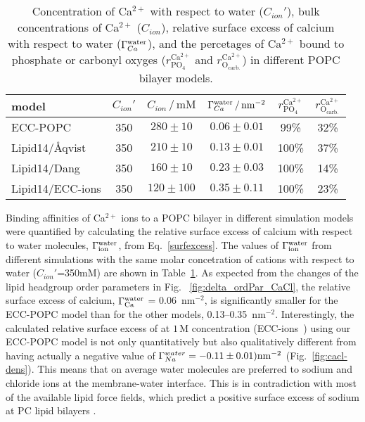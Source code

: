 \documentclass[journal=jpcbfk,manuscript=article]{achemso}
\begin{document}
\begin{table}[tb!]
  \caption{Concentration of Ca$^{2+}$ with respect to water ($C_{ion}'$), bulk concentrations of Ca$^{2+}$ ($C_{ion}$), relative surface excess of calcium with respect to water ($\Gamma_{Ca}^{\rm water}$),
    and the percetages of Ca$^{2+}$ bound to phosphate or carbonyl oxyges ($r^\mathrm{Ca^{2+}} _\mathrm{PO_4} $ and $r^\mathrm{Ca^{2+}} _\mathrm{O_{carb.}}$)
    in different POPC bilayer models. 
  \label{tab:binding}}
  \begin{tabular}{l|c c | c | c c}
    model                  & $C_{ion}'$ & $C_{ion}\,/\,\mathrm{mM}$ & $\Gamma_{Ca}^{\rm water} \,/\, \mathrm{nm}^{-2}$  & $r^\mathrm{Ca^{2+}} _\mathrm{PO_4} $ & $r^\mathrm{Ca^{2+}} _\mathrm{O_{carb.}} $ \\
    \hline
    ECC-POPC             &  350  &  $280\pm 10 $  &  $0.06 \pm 0.01 $                           &  99\%  &    32\%    \\
    Lipid14/\AA{}qvist     &  350  &  $210\pm 10 $  &  $0.13 \pm 0.01 $                          & 100\%  &    37\%     \\
    Lipid14/Dang           &  350  &  $160\pm 10 $  &  $0.23 \pm 0.03 $                            & 100\%  &    14\%    \\
    Lipid14/ECC-ions       &  350  &  $120\pm 100$  &  $0.35 \pm 0.11 $                         & 100\%  &    23\%    \\
  \end{tabular}
\end{table}

Binding affinities of Ca$^{2+}$ ions to a POPC bilayer in different simulation models were quantified by calculating the relative surface excess of calcium with respect to water molecules, $\Gamma_{\rm ion}^{\rm water}$, from Eq.~\ref{surfexcess}.
The values of $\Gamma_{\rm ion}^{\rm water}$
from different simulations with the same molar concetration of cations with respect
to water ($C_{ion}'$=350mM) are shown in Table~\ref{tab:binding}.
As expected from the changes of the lipid headgroup order parameters in Fig.~ \ref{fig:delta_ordPar_CaCl}, the relative surface excess of calcium, $\Gamma_{\rm Ca}^{\rm water}$ = 0.06~nm$^{-2}$, is significantly smaller for the ECC-POPC model than for the other models, 0.13--0.35~nm$^{-2}$.
Interestingly, the calculated relative surface excess of  at $1\,\mathrm{M}$ concentration (ECC-ions~\cite{Pluharova2014}) using our ECC-POPC model is not only quantitatively but also qualitatively different from  having actually a negative value of $\Gamma_{Na}^{water} = -0.11 \pm 0.01) \rm{nm}^{-2}$ (Fig.~\ref{fig:cacl-dens}). This 
means that on average water molecules are preferred to sodium and chloride ions at the membrane-water interface.  
This is in contradiction with most of the available lipid force fields, which predict a positive surface excess of sodium at PC lipid bilayers \cite{catte16}.
\end{document}
